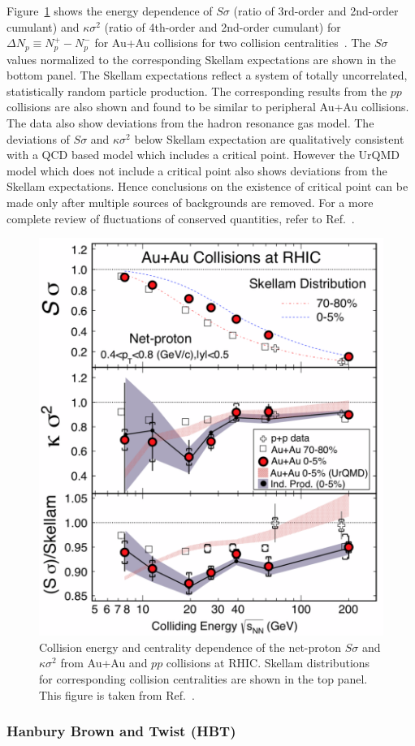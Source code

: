 Figure~\ref{fig:intro_CP_STAR} shows the energy dependence of $S\sigma$ (ratio of 3rd-order and 2nd-order cumulant) and $\kappa\sigma^2$ (ratio of 4th-order and 2nd-order cumulant) for $\Delta N_p \equiv N_p^+ - N_p^-$ for Au+Au collisions for two collision centralities~\cite{Adamczyk:2013dal}. The $S\sigma$ values normalized to the corresponding Skellam expectations are shown in the bottom panel. The Skellam expectations reflect a system of totally uncorrelated, statistically random particle production. The corresponding results from the $pp$ collisions are also shown and found to be similar to peripheral Au+Au collisions. The data also show deviations from the hadron resonance gas model. The deviations of $S\sigma$ and $\kappa\sigma^2$ below Skellam expectation are qualitatively consistent with a QCD based model which includes a critical point. However the UrQMD model which does not include a critical point also shows deviations from the Skellam expectations. Hence conclusions on the existence of critical point can be made only after multiple sources of backgrounds are removed. For a more complete review of fluctuations of conserved quantities, refer to Ref.~\cite{Luo:2017faz}.
\begin{figure}[H]
\centering
\includegraphics[width=.5\linewidth]{figs/chapter_intro/CP_STAR.png}
\caption{Collision energy and centrality dependence of the net-proton $S\sigma$ and $\kappa\sigma^2$ from Au+Au and $pp$ collisions at RHIC. Skellam distributions for corresponding collision centralities are shown in the top panel. This figure is taken from Ref.~\cite{Adamczyk:2013dal}.}
\label{fig:intro_CP_STAR}
\end{figure}



\subsubsection{Hanbury Brown and Twist (HBT)}

